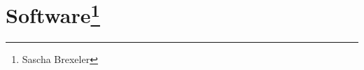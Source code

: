 \section[Software]{Software\footnote{Sascha Brexeler}}
\label{gui_software)
Die Software finden Sie in Git.\footnote{https://github.com/BeckmaR/EmbeddedMultimediaSS2016/tree/master/src/app_gui}

\paragraph{Konzept}$\;$\\
Das Softwarekonzept dient der Umsetzung des Bedienkonzepts mit "`Qt-Creator"' programmiert in C++ und Qml. Der Qt-Creator ist dafür wegen der Plattformunabhängigkeit ausgewählt.

\paragraph{Struktur}$\;$\\

\paragraph{Zustandssteuerung}$\;$\\
Die Realisierung der Grafische Oberflächen entsprechend bisheriger Einstellungen ist über Zustände einer Variablen "`appState"' realisiert, die sich die aktuellen Einstellungen bzw. den Ort merkt und entsprechend Informationen mittels der Objekteigenschaft "`visible"' ein oder ausblendet.
\paragraph{Elemente}$\;$\\
\paragraph{Einbindung der erweiterten Bedienmöglichkeiten}$\;$\\
\paragraph{Details}$\;$\\
\paragraph{Lektionen}$\;$\\

}
